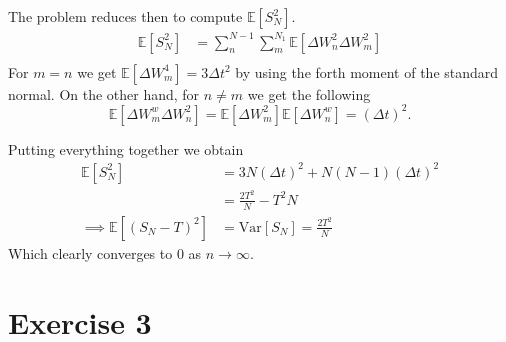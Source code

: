 \documentclass[a4paper,12pt]{article} %
\newcommand{\Var}{\mathrm{Var}}
\begin{document}
The problem reduces then to compute \(\mathbb{E} \left[ S_N^2 \right]\).
\begin{align*}
    \mathbb{E} \left[ S_N^2 \right] & = \sum_{n}^{N-1}\sum_{m}^{N_1}\mathbb{E} \left[ \Delta W_n^2 \Delta W_m^2\right] \\
\end{align*}
For \(m=n \)  we get \(\mathbb{E} \left[ \Delta W_m^4  \right]= 3\Delta t^2\) by using the forth moment of the standard normal.
On the other hand, for \(n\neq m\) we get the following
\begin{equation}
    \mathbb{E} \left[ \Delta W_m^w \Delta  W_n^2 \right] = \mathbb{E} \left[ \Delta  W_m ^2\right] \mathbb{E} \left[ \Delta  W_n^w \right] =  (\Delta t)^2.
\end{equation}

Putting everything together we obtain
\begin{align*}
    \mathbb{E} \left[ S_N^2 \right]                             & = 3N (\Delta t)^{2} +N(N-1)(\Delta t)^{2} \\
                                                                & = \frac{2T^2}{N}-T^2{N}                   \\
    \implies \mathbb{E} \left[ \left( S_N  -T\right)^2  \right] & = \Var\left[S_N  \right] = \frac{2T^2}{N}
\end{align*}
Which clearly converges to \(0\) as \(n\to  \infty \).

\section{Exercise 3}
\end{document}
